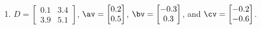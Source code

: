 \begin{exercise}
\begin{enumerate}
\item\label{ex:matveciv} \(D=\begin{bmatrix} 0.1&3.4
\\3.9&5.1 \end{bmatrix}\), 
\(\av=\begin{bmatrix} 0.2\\0.5 \end{bmatrix}\),
\(\bv=\begin{bmatrix} -0.3\\0.3 \end{bmatrix}\), and
\(\cv=\begin{bmatrix} -0.2\\-0.6 \end{bmatrix}\).


\end{enumerate}
\end{exercise}



